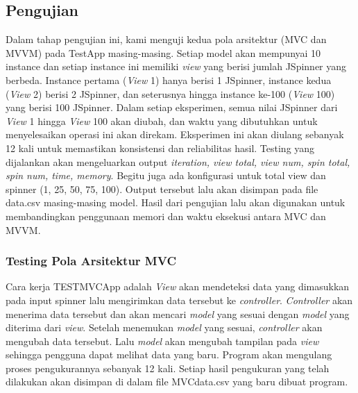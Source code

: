 \documentclass[conference]{IEEEtran}
\begin{document}
	\subsection{Pengujian}
	Dalam tahap pengujian ini, kami menguji kedua pola arsitektur (MVC dan MVVM) pada TestApp masing-masing. Setiap model akan mempunyai 10 instance dan setiap instance ini memiliki \textit{view} yang berisi jumlah JSpinner yang berbeda. Instance pertama (\textit{View} 1) hanya berisi 1 JSpinner, instance kedua (\textit{View} 2) berisi 2 JSpinner, dan seterusnya hingga instance ke-100 (\textit{View} 100) yang berisi 100 JSpinner. Dalam setiap eksperimen, semua nilai JSpinner dari \textit{View} 1 hingga \textit{View} 100 akan diubah, dan waktu yang dibutuhkan untuk menyelesaikan operasi ini akan direkam. Eksperimen ini akan diulang sebanyak 12 kali untuk memastikan konsistensi dan reliabilitas hasil. Testing yang dijalankan akan mengeluarkan output \textit{iteration, view total, view num, spin total, spin num, time, memory}. Begitu juga ada konfigurasi untuk total view dan spinner (1, 25, 50, 75, 100). Output tersebut lalu akan disimpan pada file data.csv masing-masing model. Hasil dari pengujian lalu akan digunakan untuk membandingkan penggunaan memori dan waktu eksekusi antara MVC dan MVVM. 
	\subsubsection{Testing Pola Arsitektur MVC}
	Cara kerja TESTMVCApp adalah \textit{View} akan mendeteksi data yang dimasukkan pada input spinner lalu mengirimkan data tersebut ke \textit{controller}. \textit{Controller} akan menerima data tersebut dan akan mencari \textit{model} yang sesuai dengan \textit{model} yang diterima dari \textit{view}. Setelah menemukan \textit{model} yang sesuai, \textit{controller} akan mengubah data tersebut. Lalu \textit{model} akan mengubah tampilan pada \textit{view} sehingga pengguna dapat melihat data yang baru. Program akan mengulang proses pengukurannya sebanyak 12 kali. Setiap hasil pengukuran yang telah dilakukan akan disimpan di dalam file MVCdata.csv yang baru dibuat program.
\end{document}
